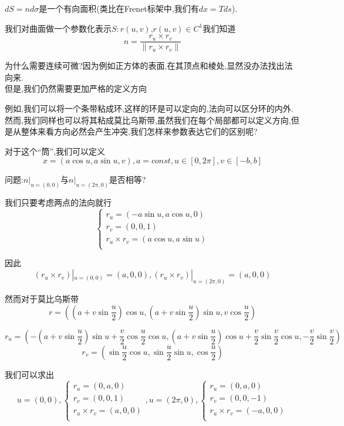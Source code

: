 \documentclass[11pt,hyperref,a4paper,UTF8]{ctexart}
\begin{document}
\begin{CJK}{UTF8}{gkai}
$dS = n d\sigma$是一个有向面积(类比在Frenet标架中,我们有$dx = T ds$).

我们对曲面做一个参数化表示$S: r(u,v)$,$r(u,v) \in C^1$我们知道
\[n = \frac{r_u \times r_v}{\|r_u \times r_v\|}\]

为什么需要连续可微?因为例如正方体的表面,在其顶点和棱处,显然没办法找出法向来.\\

但是,我们仍然需要更加严格的定义方向

例如,我们可以将一个条带粘成环,这样的环是可以定向的,法向可以区分环的内外.然而,我们同样也可以将其粘成莫比乌斯带,虽然我们在每个局部都可以定义方向,但是从整体来看方向必然会产生冲突,我们怎样来参数表达它们的区别呢?

对于这个``筒'',我们可以定义
\[x = (a\cos u, a \sin u, v), a = const, u \in [0,2\pi], v \in [-b,b]\]

问题:$n|_{u = (0,0)}$与$n|_{u = (2\pi,0)}$是否相等?

我们只要考虑两点的法向就行
\[\begin{cases}
  r_u = (-a\sin u,a\cos u, 0)\\
  r_v = (0,0,1)\\
  r_u \times r_v = (a\cos u,a \sin u)\\
\end{cases}\]

因此
\[(r_u \times r_v)|_{u = (0,0)} = (a,0,0),(r_u \times r_v)|_{u = (2\pi,0)} = (a,0,0)\]

然而对于莫比乌斯带
\[r = ((a + v\sin \frac{u}{2})\cos u,(a + v\sin \frac{u}{2})\sin u, v\cos \frac{u}{2})\]

\[r_u = (-(a + v\sin \frac{u}{2})\sin u + \frac{v}{2}\cos \frac{u}{2}\cos u, (a + v\sin \frac{u}{2})\cos u + \frac{v}{2}\sin \frac{v}{2} \cos u,- \frac{v}{2}\sin \frac{v}{2})\]
\[r_v = (\sin \frac{u}{2}\cos u, \sin \frac{u}{2} \sin u, \cos \frac{u}{2})\]

我们可以求出
\[u = (0,0),\begin{cases}
  r_u = (0,a,0)\\
  r_v = (0,0,1)\\
  r_u \times r_v = (a,0,0)\\
\end{cases}, u = (2\pi,0),\begin{cases}
  r_u = (0,a,0)\\
  r_v = (0,0,-1)\\
  r_u \times r_v = (-a,0,0)\\
\end{cases}\]


\end{CJK}
\end{document}
